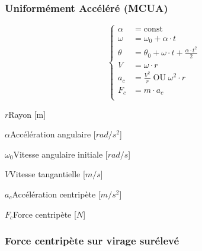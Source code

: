 \documentclass[12pt,a4paper]{article} %
\newcommand\const{\mathrm{const}}
\begin{document}
\subsubsection*{Uniformément Accéléré (MCUA)}
\begin{twocols}
	\[
	\left\{
		\begin{aligned}
			\alpha &= \const \\
			\omega &= \omega_0 + \alpha \cdot t \\
			\theta &= \theta_0 + \omega \cdot t + \frac{\alpha \cdot t^2}{2} \\
			V &= \omega \cdot r \\
			a_c &= \frac{V^2}{r}\;\text{OU}\;\omega^2 \cdot r \\
			F_c &= m \cdot a_c \\
		\end{aligned}
	\right.
	\]
\nextcol
	\begin{vardef}
		\item{$r$}{Rayon [m]}
		\item{$\alpha$}{Accélération angulaire [$rad/s^2$]}
		\item{$\omega_0$}{Vitesse angulaire initiale [$rad/s$]}
		\item{$V$}{Vitesse tangantielle [$m/s$]}
		\item{$a_c$}{Accélération centripète [$m/s^2$]}
		\item{$F_c$}{Force centripète [$N$]}
	\end{vardef}
\end{twocols}

\newpage

\subsubsection*{Force centripète sur virage surélevé}
\end{document}
